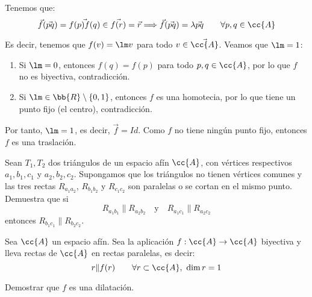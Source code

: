 \begin{ejercicio}
\begin{enumerate}
        Tenemos que:
        \begin{equation*}
            \vec{f}(\vec{pq}) = \vec{f(p)f(q)} \in \vec{f(r)} = \vec{r} \Longrightarrow \vec{f}(\vec{pq}) = \lambda \vec{pq} \qquad \forall p,q\in \cc{A}
        \end{equation*}

        Es decir, tenemos que $f(v)=\lm v$ para todo $v\in \vec{\cc{A}}$. Veamos que $\lm =1$:
        \begin{enumerate}
            \item Si $\lm=0$, entonces $f(q)=f(p)$ para todo $p,q\in \cc{A}$, por lo que $f$ no es biyectiva, contradicción.
            \item Si $\lm \in \bb{R}\setminus \{0,1\}$, entonces $f$ es una homotecia, por lo que tiene un punto fijo (el centro), contradicción.
        \end{enumerate}
        Por tanto, $\lm=1$, es decir, $\vec{f}=Id$. Como $f$ no tiene ningún punto fijo, entonces $f$ es una traslación.
    \end{enumerate}
\end{ejercicio}

\begin{ejercicio}
    Sean $T_1, T_2$ dos triángulos de un espacio afín $\cc{A}$, con vértices respectivos $a_1, b_1, c_1$ y $a_2, b_2, c_2$. Supongamos que los triángulos no tienen vértices comunes y las tres rectas $R_{a_1a_2}$, $R_{b_1b_2}$ y $R_{c_1c_2}$ son paralelas o se cortan en el mismo punto. Demuestra que si
    \begin{equation*}
        R_{a_1b_1} \| R_{a_2b_2}
        \quad \text{y} \quad
        R_{a_1c_1} \| R_{a_2c_2}
    \end{equation*}
    entonces $R_{b_1c_1} \| R_{b_2c_2}$.
\end{ejercicio}

\begin{ejercicio}
    Sea $\cc{A}$ un espacio afín. Sea la aplicación $f:\cc{A}\to \cc{A}$ biyectiva y lleva rectas de $\cc{A}$ en rectas paralelas, es decir:
    \begin{equation*}
        r\|f(r) \qquad \forall r\subset \cc{A},~ \dim r =1
    \end{equation*}

    Demostrar que $f$ es una dilatación.
\end{ejercicio}